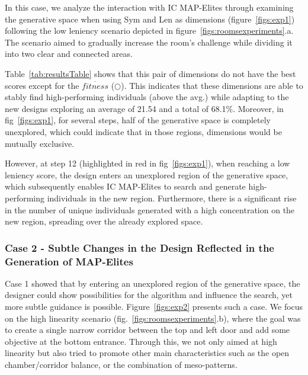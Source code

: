 In this case, we analyze the interaction with IC MAP-Elites through examining the generative space when using Sym and Len as dimensions (figure~\ref{figs:exp1}) following the low leniency scenario depicted in figure~\ref{figs:roomsexperiments}.a. The scenario aimed to gradually increase the room's challenge while dividing it into two clear and connected areas.

Table~\ref{tab:resultsTable} shows that this pair of dimensions do not have the best scores except for the $\overline{fitness}$ ($\bigcirc$). This indicates that these dimensions are able to stably find high-performing individuals (above the avg.) while adapting to the new designs exploring an average of 21.54 and a total of 68.1\%. Moreover, in fig~\ref{figs:exp1}, for several steps, half of the generative space is completely unexplored, which could indicate that in those regions, dimensions would be mutually exclusive. 

However, at step 12 (highlighted in red in fig~\ref{figs:exp1}), when reaching a low leniency score, the design enters an unexplored region of the generative space, which subsequently enables IC MAP-Elites to search and generate high-performing individuals in the new region. Furthermore, there is a significant rise in the number of unique individuals generated with a high concentration on the new region, spreading over the already explored space.

\subsubsection{Case 2 - Subtle Changes in the Design Reflected in the Generation of MAP-Elites} \label{sec:case2}

Case 1 showed that by entering an unexplored region of the generative space, the designer could show possibilities for the algorithm and influence the search, yet more subtle guidance is possible. Figure~\ref{figs:exp2} presents such a case. We focus on the high linearity scenario (fig.~\ref{figs:roomsexperiments}.b), where the goal was to create a single narrow corridor between the top and left door and add some objective at the bottom entrance. Through this, we not only aimed at high linearity but also tried to promote other main characteristics such as the open chamber/corridor balance, or the combination of meso-patterns.

